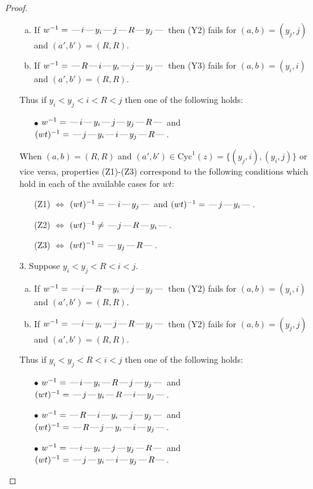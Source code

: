 \documentclass[10pt]{article}
\theoremstyle{definition}
\theoremstyle{definition}
\def\dash{\text{\hspace{0.5mm}---\hspace{0.5mm}}}
\def\Cyc{\mathrm{Cyc}}
\begin{document}
\begin{proof}
\begin{enumerate}
\begin{enumerate}[(a)]
\item If $w^{-1} = \dash i\dash y_i\dash j\dash R\dash y_j\dash $ then (Y2) fails for $(a,b)=(y_j,j)$ and $(a',b')=(R,R)$.
\item If $w^{-1} = \dash R\dash i\dash y_i\dash j\dash y_j\dash $ then (Y3) fails for $(a,b)=(y_i,i)$ and $(a',b')=(R,R)$.
\end{enumerate}
Thus if $y_i < y_j < i < R < j$ then one of the following holds:
\begin{enumerate}
\item[$\bullet$] $w^{-1} = \dash i\dash y_i\dash j\dash y_j\dash R\dash $ and $(wt)^{-1} = \dash j\dash y_i\dash i\dash y_j\dash R\dash $.
\end{enumerate}
When $(a,b)= (R,R)$ and $(a',b')\in \Cyc^1(z)=\{(y_j,i),(y_i,j)\}$ or vice versa,
properties (Z1)-(Z3) correspond to the following conditions which
hold in each of the available cases for $wt$:
\begin{enumerate}
\item[](Z1) $\Leftrightarrow$ $(wt)^{-1} = \dash i \dash y_j \dash$  and $(wt)^{-1} = \dash j \dash y_i \dash$.
\item[](Z2) $\Leftrightarrow$ $(wt)^{-1} \neq \dash j \dash R \dash y_i \dash$.
\item[](Z3) $\Leftrightarrow$ $(wt)^{-1} = \dash y_j \dash R \dash$.
\end{enumerate}
\item[$3$.] Suppose $y_i < y_j < R < i < j$.
\begin{enumerate}[(a)]
\item If $w^{-1} = \dash i\dash R\dash y_i\dash j\dash y_j\dash $ then (Y2) fails for $(a,b)=(y_i,i)$ and $(a',b')=(R,R)$.
\item If $w^{-1} = \dash i\dash y_i\dash j\dash R\dash y_j\dash $ then (Y2) fails for $(a,b)=(y_j,j)$ and $(a',b')=(R,R)$.
\end{enumerate}
Thus if $y_i < y_j < R < i < j$ then one of the following holds:
\begin{enumerate}
\item[$\bullet$] $w^{-1} = \dash i\dash y_i\dash R\dash j\dash y_j\dash $ and $(wt)^{-1} = \dash j\dash y_i\dash R\dash i\dash y_j\dash $.
\item[$\bullet$] $w^{-1} = \dash R\dash i\dash y_i\dash j\dash y_j\dash $ and $(wt)^{-1} = \dash R\dash j\dash y_i\dash i\dash y_j\dash $.
\item[$\bullet$] $w^{-1} = \dash i\dash y_i\dash j\dash y_j\dash R\dash $ and $(wt)^{-1} = \dash j\dash y_i\dash i\dash y_j\dash R\dash $.

\end{enumerate}
\end{enumerate}
\end{proof}
\end{document}

